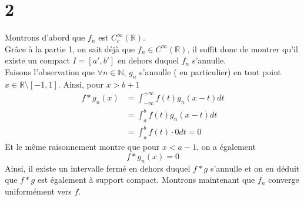 \documentclass[11pt, a4paper]{article}
\begin{document}
\section*{2}
Montrons d'abord que $f_n$ est $C^{ \infty }_c( \mathbb{R} ) $.\\
Grâce à la partie 1, on sait déjà que $f_n \in C^{ \infty }( \mathbb{R}) $, il suffit donc de montrer qu'il existe un compact $I = [ a',b'] $ en dehors duquel $f_n$ s'annulle.\\
Faisons l'observation que  $\forall n \in \mathbb{N}$, $g_n$ s'annulle ( en particulier)  en tout point $x \in \mathbb{R} \setminus [ -1,1] $.
Ainsi, pour $x>b+1$ 
\begin{align*}
	f\ast g_n (x ) &= \int_{-\infty}^{+\infty} f( t) g_n( x-t) dt\\
		     &= \int_{ a }^{ b } f( t) g_n( x-t) dt\\
		     &= \int_{ a }^{ b } f( t) \cdot 0 dt =0
\end{align*}
Et le même raisonnement montre que pour $x<a-1$, on a également
\[ 
	f \ast g_n ( x) = 0
\]
Ainsi, il existe un intervalle fermé en dehors duquel $f\ast g$ s'annulle et on en déduit que $f\ast g$ est également à support compact.
Montrons maintenant que $f_n$ converge uniformément vers $f$.
\end{document}
